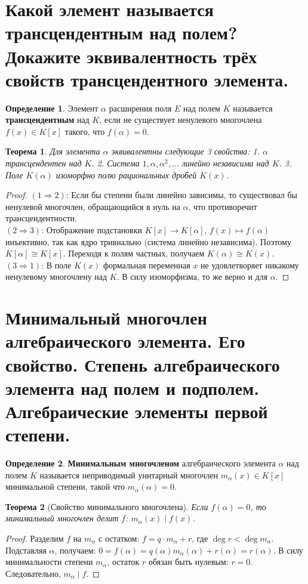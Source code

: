 \documentclass[12pt, a4paper]{article}
\theoremstyle{definition}
\newtheorem{definition}{Определение}[section]
\theoremstyle{plain}
\newtheorem{theorem}{Теорема}[section]
\begin{document}
	\newpage
	\section{Какой элемент называется трансцендентным над полем? Докажите эквивалентность трёх свойств трансцендентного элемента.}
	
	\begin{definition}
		Элемент $\alpha$ расширения поля $E$ над полем $K$ называется \textbf{трансцендентным} над $K$, если не существует ненулевого многочлена $f(x) \in K[x]$ такого, что $f(\alpha)=0$.
	\end{definition}
	
	\begin{theorem}
		Для элемента $\alpha$ эквивалентны следующие 3 свойства:
		1. $\alpha$ трансцендентен над $K$.
		2. Система $1, \alpha, \alpha^2, \dots$ линейно независима над $K$.
		3. Поле $K(\alpha)$ изоморфно полю рациональных дробей $K(x)$.
	\end{theorem}
	\begin{proof}
		$(1 \Rightarrow 2)$: Если бы степени были линейно зависимы, то существовал бы ненулевой многочлен, обращающийся в нуль на $\alpha$, что противоречит трансцендентности. \\
		$(2 \Rightarrow 3)$: Отображение подстановки $K[x] \to K[\alpha]$, $f(x) \mapsto f(\alpha)$ инъективно, так как ядро тривиально (система линейно независима). Поэтому $K[\alpha] \cong K[x]$. Переходя к полям частных, получаем $K(\alpha) \cong K(x)$. \\
		$(3 \Rightarrow 1)$: В поле $K(x)$ формальная переменная $x$ не удовлетворяет никакому ненулевому многочлену над $K$. В силу изоморфизма, то же верно и для $\alpha$.
	\end{proof}
	
	\newpage
	\section{Минимальный многочлен алгебраического элемента. Его свойство. Степень алгебраического элемента над полем и подполем. Алгебраические элементы первой степени.}
	
	\begin{definition}
		\textbf{Минимальным многочленом} алгебраического элемента $\alpha$ над полем $K$ называется неприводимый унитарный многочлен $m_\alpha(x) \in K[x]$ минимальной степени, такой что $m_\alpha(\alpha)=0$.
	\end{definition}
	
	\begin{theorem}[Свойство минимального многочлена]
		Если $f(\alpha)=0$, то минимальный многочлен делит $f$: $m_\alpha(x) \mid f(x)$.
	\end{theorem}
	\begin{proof}
		Разделим $f$ на $m_\alpha$ с остатком: $f = q \cdot m_\alpha + r$, где $\deg r < \deg m_\alpha$. Подставляя $\alpha$, получаем: $0 = f(\alpha) = q(\alpha)m_\alpha(\alpha) + r(\alpha) = r(\alpha)$. В силу минимальности степени $m_\alpha$, остаток $r$ обязан быть нулевым: $r=0$. Следовательно, $m_\alpha \mid f$.
	\end{proof}
	
\end{document}
